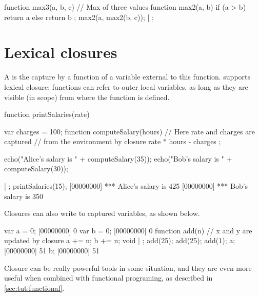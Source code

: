 \begin{urbiscript}[firstnumber=last]
function max3(a, b, c) // Max of three values
{
  function max2(a, b)
  {
    if (a > b)
      return a
    else
      return b
  };
  max2(a, max2(b, c));
} | {};
\end{urbiscript}

\section{Lexical closures}

A  is the capture by a function of a variable external to this
function. \us supports lexical closure: functions can refer to outer
local variables, as long as they are visible (in scope) from where
the function is defined.

\begin{urbiscript}[firstnumber=last]
function printSalaries(rate)
{
  var charges = 100;
  function computeSalary(hours)
  {
    // Here rate and charges are captured
    // from the environment by closure
    rate * hours - charges
  };

  echo("Alice's salary is " + computeSalary(35));
  echo("Bob's salary is " + computeSalary(30));
} | {};
printSalaries(15);
[00000000] *** Alice's salary is 425
[00000000] *** Bob's salary is 350
\end{urbiscript}

Closures can also write to captured variables, as shown below.

\begin{urbiscript}[firstnumber=last]
var a = 0;
[00000000] 0
var b = 0;
[00000000] 0
function add(n)
{
  // x and y are updated by closure
  a += n;
  b += n;
  void
} | {};
add(25);
add(25);
add(1);
a;
[00000000] 51
b;
[00000000] 51
\end{urbiscript}

Closure can be really powerful tools in some situation, and they are
even more useful when combined with functional programing, as
described in \autoref{sec:tut:functional}.



